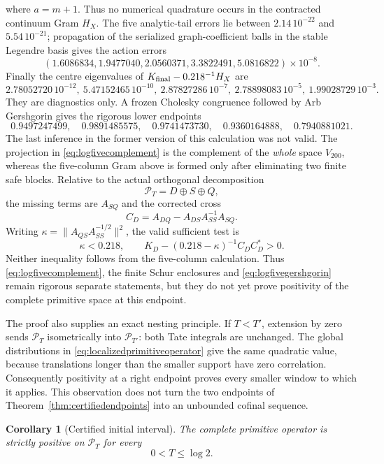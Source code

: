 \documentclass[11pt]{amsart}
\newtheorem{corollary}[theorem]{Corollary}
\theoremstyle{definition}
\theoremstyle{remark}
\begin{document}
where \(a=m+1\).  Thus no numerical quadrature occurs in the contracted
continuum Gram \(H_X\).  The five analytic-tail errors lie between
\(2.14\,10^{-22}\) and \(5.54\,10^{-21}\); propagation of the serialized
graph-coefficient balls in the stable Legendre basis gives the action
errors
\[
 (1.6086834,1.9477040,2.0560371,3.3822491,5.0816822)\times10^{-8}.
\]
Finally the centre eigenvalues of
\(K_{\rm final}-0.218^{-1}H_X\) are
\[
 2.78052720\,10^{-12},\ 5.47152465\,10^{-10},\
 2.87827286\,10^{-7},\ 2.78898083\,10^{-5},\
 1.99028729\,10^{-3}.
\]
They are diagnostics only.  A frozen Cholesky congruence followed by Arb
Gershgorin gives the rigorous lower endpoints
\begin{equation}\label{eq:logfivegershgorin}
 0.9497247499,\quad0.9891485575,\quad0.9741473730,\quad
 0.9360164888,\quad0.7940881021.
\end{equation}
The last inference in the former version of this calculation was not valid.
The projection in \eqref{eq:logfivecomplement} is the complement of the
\emph{whole} space \(V_{200}\), whereas the five-column Gram above is formed
only after eliminating two finite safe blocks.  Relative to the actual
orthogonal decomposition
\[
 \mathcal P_T=D\oplus S\oplus Q,
\]
the missing terms are \(A_{SQ}\) and the corrected cross
\[
 C_D=A_{DQ}-A_{DS}A_{SS}^{-1}A_{SQ}.
\]
Writing \(\kappa=\|A_{QS}A_{SS}^{-1/2}\|^2\), the valid sufficient test is
\[
 \kappa<0.218,
 \qquad
 K_D-(0.218-\kappa)^{-1}C_DC_D^*>0.
\]
Neither inequality follows from the five-column calculation.  Thus
\eqref{eq:logfivecomplement}, the finite Schur enclosures and
\eqref{eq:logfivegershgorin} remain rigorous separate statements, but they
do not yet prove positivity of the complete primitive space at this
endpoint.

The proof also supplies an exact nesting principle.  If \(T<T'\), extension
by zero sends \(\mathcal P_T\) isometrically into \(\mathcal P_{T'}\): both
Tate integrals are unchanged.  The global distributions in
\eqref{eq:localizedprimitiveoperator} give the same quadratic value, because
translations longer than the smaller support have zero correlation.
Consequently positivity at a right endpoint proves every smaller window to
which it applies.  This observation does not turn the two endpoints of
Theorem~\ref{thm:certifiedendpoints} into an unbounded cofinal sequence.

\begin{corollary}[Certified initial interval]\label{cor:certifiedinitialinterval}
The complete primitive operator is strictly positive on \(\mathcal P_T\)
for every
\[
 0<T\le\log2.
\]
\end{corollary}
\end{document}
